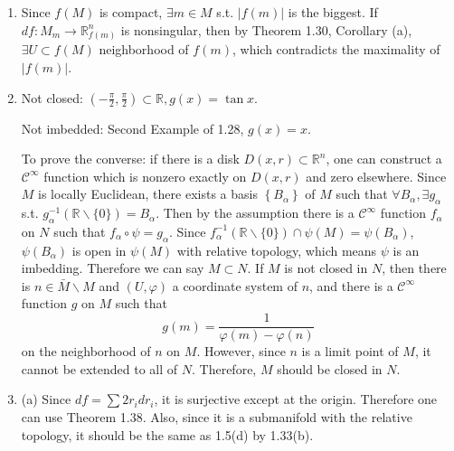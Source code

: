 \begin{enumerate}
If $p=\left(-\frac{1}{3},-\frac{1}{3}\right)$, then $f(x, y)=f\big(\frac{1}{3}, \frac{1}{3}\big)$ iff
\[x^{3}+x y+y^{3}-\frac{1}{27}=0\] iff 
\[\left(x+y-\frac{1}{3}\right)\left(x^{2}+y^{2}+\frac{1}{9}+\frac{x}{3}+\frac{y}{3}-x y\right)=0\]
iff $x+y=\frac{1}{3}$, since
\[x^{2}+y^{2}+\frac{1}{9}+\frac{x}{3}+\frac{y}{3}-x y
=\frac{1}{2}\left(\Big(x+\frac{1}{3}\Big)^{2}+\Big(y+\frac{1}{3}\Big)^{2}+(x-y)^{2}\right).\]
Therefore $f^{-1}\big(f\big(\!-\frac{1}{3},-\frac{1}{3}\big)\big)$ is a line, which is an imbedded submanifold.
\item Since $f(M)$ is compact, $\exists m \in M$ s.t. $|f(m)|$ is the biggest. If $df\colon M_{m} \rightarrow \mathbb{R}_{f(m)}^{n}$ is nonsingular, 
then by Theorem 1.30, Corollary (a), $\exists U \subset f(M)$ neighborhood of $f(m)$, which contradicts the maximality of $|f(m)|$.
\item Not closed: $\left(-\frac{\pi}{2}, \frac{\pi}{2}\right) \subset \mathbb{R}, g(x)=\tan x$.

Not imbedded: Second Example of 1.28, $g(x)=x$.

To prove the converse: if there is a disk $D(x, r) \subset \mathbb{R}^{n}$, 
one can construct a $\mathcal{C}^{\infty}$ function which is nonzero exactly on $D(x, r)$ and zero elsewhere. 
Since $M$ is locally Euclidean, there exists a basis $\left\{B_{\alpha}\right\}$ of $M$ such that $\forall B_{\alpha}, \exists g_{\alpha}$ s.t. $g_{\alpha}^{-1}(\mathbb{R} \backslash\{0\})=B_{\alpha}$. 
Then by the assumption there is a $\mathcal{C}^{\infty}$ function $f_{\alpha}$ on $N$ such that $f_{\alpha} \circ \psi=g_{\alpha}$. 
Since $f_{\alpha}^{-1}(\mathbb{R} \backslash\{0\}) \cap \psi(M)=\psi(B_{\alpha})$, 
$\psi(B_{\alpha})$ is open in $\psi(M)$ with relative topology, which means $\psi$ is an imbedding.
Therefore we can say $M \subset N$. If $M$ is not closed in $N$, 
then there is $n \in \bar{M} \backslash M$ and $(U, \varphi)$ a coordinate system of $n$, 
and there is a $\mathcal{C}^{\infty}$ function $g$ on $M$ such that
\[g(m)=\frac{1}{\varphi(m)-\varphi(n)}\]
on the neighborhood of $n$ on $M$. 
However, since $n$ is a limit point of $M$, it cannot be extended to all of $N$. Therefore, $M$ should be closed in $N$.
\item (a) Since $d f=\sum 2 r_{i} d r_{i}$, it is surjective except at the origin. Therefore one can use Theorem 1.38. 
Also, since it is a submanifold with the relative topology, it should be the same as 1.5(d) by 1.33(b).


\end{enumerate}
